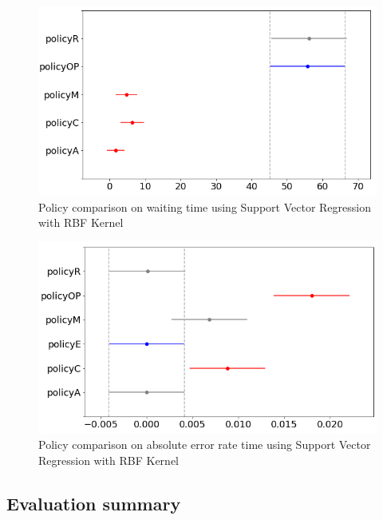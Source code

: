 \documentclass{mpaper}
\begin{document}
\begin{figure}[h]
    \centering
    \includegraphics[scale=0.35]{imgs/svr_rbf_R5_waiting_plot_diff_means.png}
    \caption{Policy comparison on waiting time using Support Vector Regression with RBF Kernel}
    \label{fig:svr_rbf_R5_waiting_plot_diff_means}
\end{figure}
\begin{figure}[h]
    \centering
    \includegraphics[scale=0.35]{imgs/svr_rbf_R5_error_plot_diff_means.png}
    \caption{Policy comparison on absolute error rate time using Support Vector Regression with RBF Kernel}
    \label{fig:svr_rbf_R5_waiting_plot_diff_means}
\end{figure}

\subsection{Evaluation summary}
\end{document}

